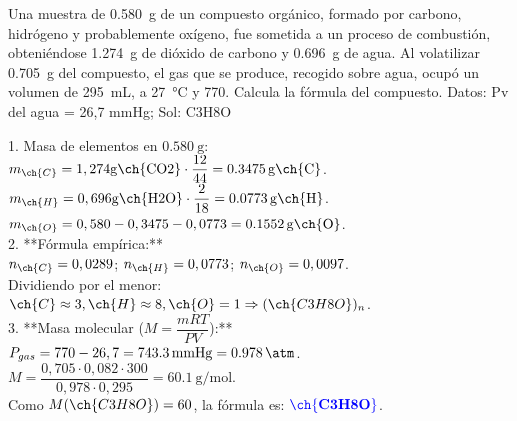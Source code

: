 \begin{exercise}
    Una muestra de \qty{0.580}{\g} de un compuesto orgánico, formado por carbono, hidrógeno y probablemente oxígeno, fue sometida a un proceso de combustión, obteniéndose \qty{1.274}{\g} de dióxido de carbono y \qty{0.696}{\g} de agua. Al volatilizar \qty{0.705}{\g} del compuesto, el gas que se produce, recogido sobre agua, ocupó un volumen de \qty{295}{\mL}, a \qty{27}{\celsius} y \qty{770}{\mmhg}. Calcula la fórmula del compuesto.
    Datos: Pv del agua = 26,7 mmHg;
    Sol: C3H8O

    \begin{solu}
        1. Masa de elementos en \( \qty{0,580}{\g} \): \\
        \( m_{\ch{C}} = 1,274 \si{\g \ch{CO2}} \cdot \dfrac{12}{44} = \qty{0,3475}{\g \ch{C}} \). \\
        \( m_{\ch{H}} = 0,696 \si{\g \ch{H2O}} \cdot \dfrac{2}{18} = \qty{0,0773}{\g \ch{H}} \). \\
        \( m_{\ch{O}} = 0,580 - 0,3475 - 0,0773 = \qty{0,1552}{\g \ch{O}} \). \\
        2. **Fórmula empírica:** \\
        \( n_{\ch{C}} = 0,0289 \); \( n_{\ch{H}} = 0,0773 \); \( n_{\ch{O}} = 0,0097 \). \\
        Dividiendo por el menor: \( \ch{C} \approx 3, \ch{H} \approx 8, \ch{O} = 1 \Rightarrow (\ch{C3H8O})_n \). \\
        3. **Masa molecular (\( M = \dfrac{mRT}{PV} \)):** \\
        \( P_{gas} = 770 - 26,7 = \qty{743,3}{\mmHg} = \qty{0,978}{\atm} \). \\
        \( M = \dfrac{0,705 \cdot 0,082 \cdot 300}{0,978 \cdot 0,295} = \qty{60,1}{\g\per\mol} \). \\
        Como \( M(\ch{C3H8O}) = 60 \), la fórmula es: \(\mathbf{\textcolor{blue}{\ch{C3H8O}}}\).
    \end{solu}
\end{exercise}

